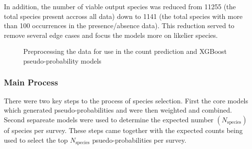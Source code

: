 In addition, the number of viable output species was reduced from 11255 (the total species present accross all data) down to 1141 (the total species with more than 100 occurrences in the presence/absence data). 
This reduction served to remove several edge cases and focus the models more on likelier species.

\begin{figure}\label{fig:preproc}
    \begin{center}
        
        \caption{Preprocessing the data for use in the count prediction and XGBoost pseudo-probability models}
    \end{center}
\end{figure}



\subsubsection{Main Process}
\newcommand{\nspecies}{N_{\text{species}}}

There were two key steps to the process of species selection. First the core models which generated pseudo-probabilities and were then weighted and combined.
Second separeate models were used to determine the expected number $(\nspecies)$ of species per survey.
These steps came together with the expected counts being used to select the top  $\nspecies$ psuedo-probabilities per survey.

%         
%         

